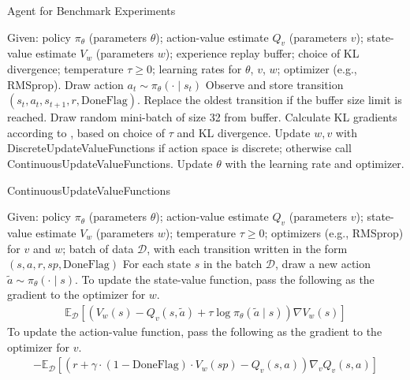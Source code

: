\documentclass[twoside,11pt]{article}
\newcommand{\Ex}{\mathbb{E}}
\begin{document}
\begin{algorithm}
\caption{Agent for Benchmark Experiments}
\label{alg:kl-agent}
\begin{algorithmic}
    \State Given: policy $\pi_\theta$ (parameters $\theta$); action-value estimate $Q_v$ (parameters $v$); state-value estimate $V_w$ (parameters $w$); experience replay buffer; choice of KL divergence; temperature $\tau \geq 0$; learning rates for $\theta$, $v$, $w$; optimizer (e.g., RMSprop).
        \State Draw action $a_t \sim \pi_\theta(\cdot \mid s_t)$
        \State Observe and store transition $(s_t, a_t, s_{t + 1}, r, \text{DoneFlag})$. Replace the oldest transition if the buffer size limit is reached. 
            \State Draw random mini-batch of size 32 from buffer. 
                \State Calculate KL gradients according to , based on choice of $\tau$ and KL divergence.
            \EndFor
            \State Update $w, v$ with DiscreteUpdateValueFunctions if action space is discrete; otherwise call ContinuousUpdateValueFunctions.
            \State Update $\theta$ with the learning rate and optimizer.
        \EndIf
    \EndFor
\end{algorithmic}
\end{algorithm}

\begin{algorithm}
\caption{ContinuousUpdateValueFunctions}
\label{alg:continuous-value-update}
\begin{algorithmic}
    \State Given: policy $\pi_\theta$ (parameters $\theta$); action-value estimate $Q_v$ (parameters $v$); state-value estimate $V_w$ (parameters $w$); temperature $\tau \geq 0$; optimizers (e.g., RMSprop) for $v$ and $w$; batch of data $\mathcal{D}$, with each transition written in the form $(s, a, r, sp, \text{DoneFlag})$
    \State For each state $s$ in the batch $\mathcal{D}$, draw a new action $\tilde{a} \sim \pi_\theta(\cdot \mid s)$.
    \State To update the state-value function, pass the following as the gradient to the optimizer for $w$. 
    \begin{align*}
        \Ex_{\mathcal{D}}[(V_w(s) - Q_v(s, \tilde{a}) + \tau \log \pi_\theta (\tilde{a} \mid s)) \nabla V_w(s)]
    \end{align*}
    \State To update the action-value function, pass the following as the gradient to the optimizer for $v$. 
    \begin{align*}
        -\Ex_{\mathcal{D}}[(r + \gamma \cdot (1 - \text{DoneFlag})\cdot V_w(sp) - Q_v(s, a)) \nabla_v Q_v(s, a)]
    \end{align*}
\end{algorithmic}
\end{algorithm}
\end{document}
